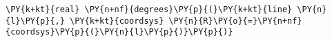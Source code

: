 \begin{Verbatim}[commandchars=\\\{\}]
    \PY{k+kt}{real} \PY{n+nf}{degrees}\PY{p}{(}\PY{k+kt}{line} \PY{n}{l}\PY{p}{,} \PY{k+kt}{coordsys} \PY{n}{R}\PY{o}{=}\PY{n+nf}{coordsys}\PY{p}{(}\PY{n}{l}\PY{p}{)}\PY{p}{)}
\end{Verbatim}
